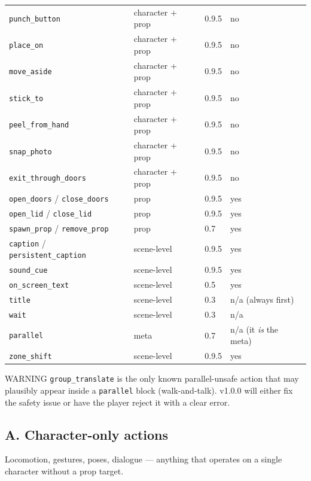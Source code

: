 \documentclass[
  11pt,
]{book}
\begin{document}
\begin{longtable}[]{@{}llll@{}}
\texttt{punch\_button} & character + prop & 0.9.5 & no \\
\texttt{place\_on} & character + prop & 0.9.5 & no \\
\texttt{move\_aside} & character + prop & 0.9.5 & no \\
\texttt{stick\_to} & character + prop & 0.9.5 & no \\
\texttt{peel\_from\_hand} & character + prop & 0.9.5 & no \\
\texttt{snap\_photo} & character + prop & 0.9.5 & no \\
\texttt{exit\_through\_doors} & character + prop & 0.9.5 & no \\
\texttt{open\_doors} / \texttt{close\_doors} & prop & 0.9.5 & yes \\
\texttt{open\_lid} / \texttt{close\_lid} & prop & 0.9.5 & yes \\
\texttt{spawn\_prop} / \texttt{remove\_prop} & prop & 0.7 & yes \\
\texttt{caption} / \texttt{persistent\_caption} & scene-level & 0.9.5 &
yes \\
\texttt{sound\_cue} & scene-level & 0.9.5 & yes \\
\texttt{on\_screen\_text} & scene-level & 0.5 & yes \\
\texttt{title} & scene-level & 0.3 & n/a (always first) \\
\texttt{wait} & scene-level & 0.3 & n/a \\
\texttt{parallel} & meta & 0.7 & n/a (it \emph{is} the meta) \\
\texttt{zone\_shift} & scene-level & 0.9.5 & yes \\
\end{longtable}

WARNING \texttt{group\_translate} is the only known parallel-unsafe
action that may plausibly appear inside a \texttt{parallel} block
(walk-and-talk). v1.0.0 will either fix the safety issue or have the
player reject it with a clear error.

\subsection{A. Character-only actions}\label{a.-character-only-actions}

Locomotion, gestures, poses, dialogue --- anything that operates on a
single character without a prop target.
\end{document}
